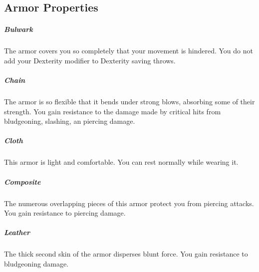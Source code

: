 

\subsection*{Armor Properties} \label{ssec::armorproperties}
    \subparagraph{Bulwark} The armor covers you so completely that your movement is hindered.
    You do not add your Dexterity modifier to Dexterity saving throws.

    \subparagraph{Chain} The armor is so flexible that it bends under strong blows, absorbing some of their strength.
    You gain resistance to the damage made by critical hits from bludgeoning, slashing, an piercing damage.

    \subparagraph{Cloth} This armor is light and comfortable.
    You can rest normally while wearing it.

    \subparagraph{Composite} The numerous overlapping pieces of this armor protect you from piercing attacks.
    You gain resistance to piercing damage.

    \subparagraph{Leather} The thick second skin of the armor disperses blunt force.
    You gain resistance to bludgeoning damage.

